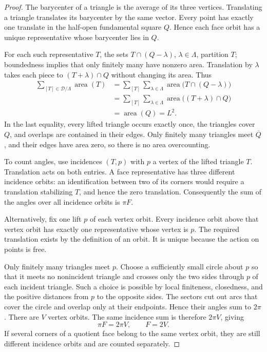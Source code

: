 \documentclass[11pt,a4paper]{article}
\theoremstyle{definition}
\theoremstyle{remark}
\DeclareMathOperator{\area}{area}
\begin{document}
\begin{proof}
The barycenter of a triangle is the average of its three vertices.
Translating a triangle translates its barycenter by the same vector.
Every point has exactly one translate in the half-open fundamental
square $Q$. Hence each face orbit has a unique representative whose
barycenter lies in $Q$.

For each such representative $T$, the sets
$T\cap(Q-\lambda)$, $\lambda\in\Lambda$, partition $T$; boundedness
implies that only finitely many have nonzero area. Translation by
$\lambda$ takes each piece to $(T+\lambda)\cap Q$ without changing
its area. Thus
\begin{align*}
\sum_{[T]\in\mathcal D/\Lambda}\area(T)
&=\sum_{[T]}\sum_{\lambda\in\Lambda}
   \area\bigl(T\cap(Q-\lambda)\bigr)\\
&=\sum_{[T]}\sum_{\lambda\in\Lambda}
   \area\bigl((T+\lambda)\cap Q\bigr)\\
&=\area(Q)=L^2.
\end{align*}
In the last equality, every lifted triangle occurs exactly once, the
triangles cover $Q$, and overlaps are contained in their edges. Only
finitely many triangles meet $\overline Q$, and their edges have area
zero, so there is no area overcounting.

To count angles, use incidences $(T,p)$ with $p$ a vertex of the lifted
triangle $T$. Translation acts on both entries. A face representative
has three different incidence orbits: an identification between two of
its corners would require a translation stabilizing $T$, and hence the
zero translation. Consequently the sum of the angles over all incidence
orbits is $\pi F$.

Alternatively, fix one lift $p$ of each vertex orbit. Every incidence orbit above that vertex orbit has exactly one
representative whose vertex is $p$. The required translation exists by
the definition of an orbit. It is unique because the action on points
is free.

Only finitely many triangles meet $p$. Choose a sufficiently small circle about $p$ so
that it meets no nonincident triangle and crosses only the two sides
through $p$ of each incident triangle. Such a choice is possible by
local finiteness, closedness, and the positive distances from $p$ to the
opposite sides. The sectors cut out arcs that cover the circle and overlap only at their
endpoints. Hence their angles sum to $2\pi$. There are $V$ vertex orbits. The same incidence
sum is therefore $2\pi V$, giving
\[
\pi F=2\pi V,\qquad F=2V.
\]
If several corners of a quotient face belong to the same vertex orbit,
they are still different incidence orbits and are counted separately.


\end{proof}
\end{document}

